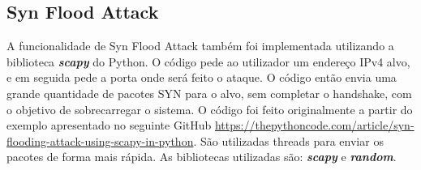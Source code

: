 \documentclass[a4paper]{article}
\begin{document}
\subsection{Syn Flood Attack}
A funcionalidade de Syn Flood Attack também foi implementada utilizando a biblioteca \textit{\textbf{scapy}} \cite{scapy}do Python.
O código pede ao utilizador um endereço IPv4 alvo, e em seguida pede a porta onde será feito o ataque. O código então
envia uma grande quantidade de pacotes SYN para o alvo, sem completar o handshake, com o objetivo de sobrecarregar o sistema.
O código foi feito originalmente a partir do exemplo apresentado no seguinte GitHub \url{https://thepythoncode.com/article/syn-flooding-attack-using-scapy-in-python}.
São utilizadas threads para enviar os pacotes de forma mais rápida. As bibliotecas utilizadas são: \textit{\textbf{scapy}} e \textit{\textbf{random}}.
\newpage
\end{document}
